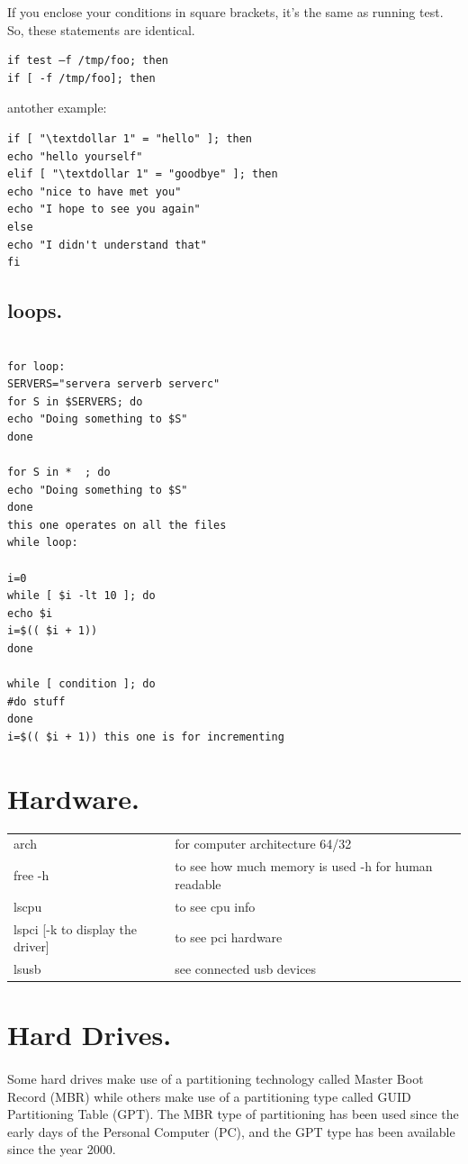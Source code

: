 \documentclass[10pt]{article}
\begin{document}
If you enclose your conditions in square brackets, it’s the same as running test. So, these statements are identical.\\
\begin{verbatim}
if test –f /tmp/foo; then
if [ -f /tmp/foo]; then
\end{verbatim}
antother example:
\begin{verbatim}
if [ "\textdollar 1" = "hello" ]; then
echo "hello yourself"
elif [ "\textdollar 1" = "goodbye" ]; then
echo "nice to have met you"
echo "I hope to see you again"
else
echo "I didn't understand that"
fi
\end{verbatim}

\subsection{loops.}
\begin{verbatim}

for loop:
SERVERS="servera serverb serverc"
for S in $SERVERS; do
echo "Doing something to $S"
done

for S in *  ; do
echo "Doing something to $S"
done
this one operates on all the files
while loop:

i=0
while [ $i -lt 10 ]; do
echo $i
i=$(( $i + 1))
done

while [ condition ]; do
#do stuff
done
i=$(( $i + 1)) this one is for incrementing

\end{verbatim}
\section{Hardware.}
\begin{center}
	\begin{tabular}{|l|l|}
		\hline
		arch & for computer architecture 64/32\\
		free -h & to see how much memory is used -h for human readable\\
		lscpu & to see cpu info\\
		lspci [-k to display the driver] & to see pci hardware\\
		lsusb & see connected usb devices\\
		\hline
	\end{tabular}
\end{center}
\section{Hard Drives.}
\paragraph{}
Some hard drives make use of a partitioning technology called Master Boot Record (MBR) while others make use
of a partitioning type called GUID Partitioning Table (GPT). The MBR type of partitioning has been used since the early
days of the Personal Computer (PC), and the GPT type has been available since the year 2000.
\end{document}
